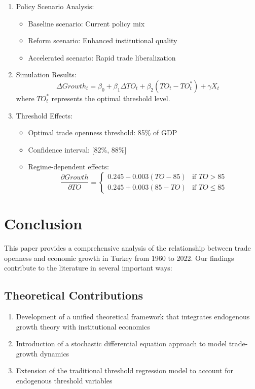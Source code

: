 \documentclass[12pt,a4paper]{article}
\theoremstyle{definition}
\begin{document}
\begin{enumerate}
    \item Policy Scenario Analysis:
    \begin{itemize}
        \item Baseline scenario: Current policy mix
        \item Reform scenario: Enhanced institutional quality
        \item Accelerated scenario: Rapid trade liberalization
    \end{itemize}

    \item Simulation Results:
    \begin{equation}
    \Delta Growth_t = \beta_0 + \beta_1 \Delta TO_t + \beta_2 (TO_t - TO_t^*) + \gamma X_t
    \end{equation}
    where $TO_t^*$ represents the optimal threshold level.

    \item Threshold Effects:
    \begin{itemize}
        \item Optimal trade openness threshold: 85\% of GDP
        \item Confidence interval: [82\%, 88\%]
        \item Regime-dependent effects:
        \begin{equation}
        \frac{\partial Growth}{\partial TO} = \begin{cases}
        0.245 - 0.003(TO - 85) & \text{if } TO > 85\\
        0.245 + 0.003(85 - TO) & \text{if } TO \leq 85
        \end{cases}
        \end{equation}
    \end{itemize}
\end{enumerate}

\section{Conclusion}
This paper provides a comprehensive analysis of the relationship between trade openness and economic growth in Turkey from 1960 to 2022. Our findings contribute to the literature in several important ways:

\subsection{Theoretical Contributions}
\begin{enumerate}
    \item Development of a unified theoretical framework that integrates endogenous growth theory with institutional economics
    \item Introduction of a stochastic differential equation approach to model trade-growth dynamics
    \item Extension of the traditional threshold regression model to account for endogenous threshold variables
\end{enumerate}
\end{document}
